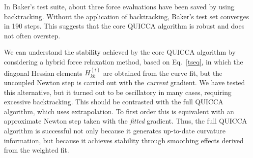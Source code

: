 \documentclass[prl,twocolumn,showpacs,twocolumngrid,superbib]{revtex4}
\begin{document}
In  Baker's test suite, about three force evaluations have been saved by 
using backtracking. Without the application of backtracking, Baker's test set
converges in 190 steps.  This suggests that the core QUICCA algorithm is robust and
does not often overstep.  

We can understand the stability achieved by the core QUICCA
algorithm by considering a hybrid force relaxation method, based on Eq.~\ref{tseq},
in which the diagonal Hessian elements $H^{(i)}_{kk}$ are obtained from the 
curve fit, but the uncoupled Newton step is carried out with the {\em current} 
gradient.  We have tested this alternative, but it turned out to be oscillatory 
in many cases, requiring excessive backtracking.  This should be contrasted with the
full QUICCA algorithm, which uses extrapolation. To first order this is equivalent with 
an approximate Newton step taken with the {\em fitted} gradient.   Thus, the full 
QUICCA algorithm is successful not only because it generates up-to-date curvature information, 
but because it achieves stability through smoothing effects derived from the weighted fit.
\end{document}
